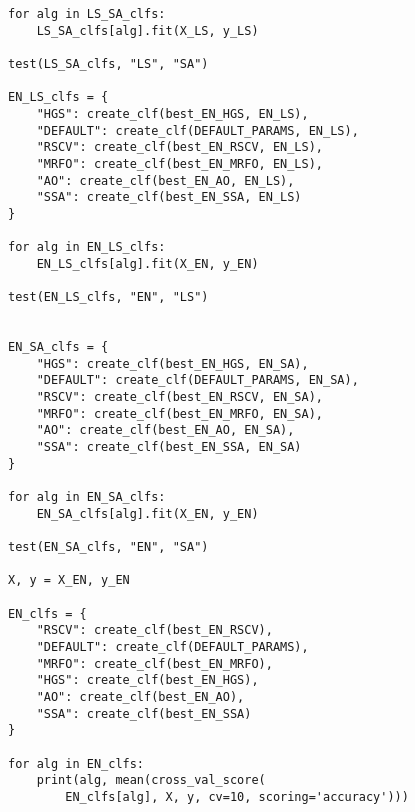 \begin{lstlisting}
for alg in LS_SA_clfs:
    LS_SA_clfs[alg].fit(X_LS, y_LS)

test(LS_SA_clfs, "LS", "SA")

EN_LS_clfs = {
    "HGS": create_clf(best_EN_HGS, EN_LS),
    "DEFAULT": create_clf(DEFAULT_PARAMS, EN_LS),
    "RSCV": create_clf(best_EN_RSCV, EN_LS),
    "MRFO": create_clf(best_EN_MRFO, EN_LS),
    "AO": create_clf(best_EN_AO, EN_LS),
    "SSA": create_clf(best_EN_SSA, EN_LS)
}

for alg in EN_LS_clfs:
    EN_LS_clfs[alg].fit(X_EN, y_EN)

test(EN_LS_clfs, "EN", "LS")


EN_SA_clfs = {
    "HGS": create_clf(best_EN_HGS, EN_SA),
    "DEFAULT": create_clf(DEFAULT_PARAMS, EN_SA),
    "RSCV": create_clf(best_EN_RSCV, EN_SA),
    "MRFO": create_clf(best_EN_MRFO, EN_SA),
    "AO": create_clf(best_EN_AO, EN_SA),
    "SSA": create_clf(best_EN_SSA, EN_SA)
}

for alg in EN_SA_clfs:
    EN_SA_clfs[alg].fit(X_EN, y_EN)

test(EN_SA_clfs, "EN", "SA")

X, y = X_EN, y_EN

EN_clfs = {
    "RSCV": create_clf(best_EN_RSCV),
    "DEFAULT": create_clf(DEFAULT_PARAMS),
    "MRFO": create_clf(best_EN_MRFO),
    "HGS": create_clf(best_EN_HGS),
    "AO": create_clf(best_EN_AO),
    "SSA": create_clf(best_EN_SSA)
}

for alg in EN_clfs:
    print(alg, mean(cross_val_score(
        EN_clfs[alg], X, y, cv=10, scoring='accuracy')))

\end{lstlisting}
